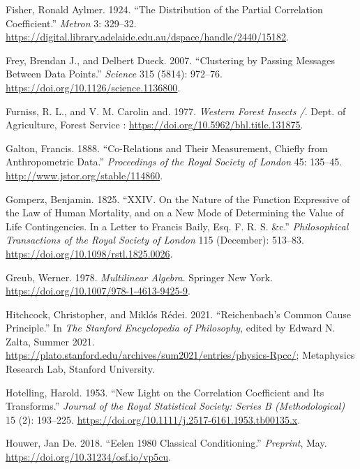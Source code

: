\documentclass[
  letterpaper,
  DIV=11,
  numbers=noendperiod]{scrreprt}
\newlength{\cslhangindent}
\newenvironment{CSLReferences}[2] %
 {\begin{list}{}{%
  \setlength{\itemindent}{0pt}
  \setlength{\leftmargin}{0pt}
  \setlength{\parsep}{0pt}
  \ifodd #1
   \setlength{\leftmargin}{\cslhangindent}
   \setlength{\itemindent}{-1\cslhangindent}
  \fi
  \setlength{\itemsep}{#2\baselineskip}}}
 {\end{list}}
\begin{document}
\begin{CSLReferences}{1}{0}
Fisher, Ronald Aylmer. 1924. {``The Distribution of the Partial
Correlation Coefficient.''} \emph{Metron} 3: 329--32.
\url{https://digital.library.adelaide.edu.au/dspace/handle/2440/15182}.

Frey, Brendan J., and Delbert Dueck. 2007. {``Clustering by Passing
Messages Between Data Points.''} \emph{Science} 315 (5814): 972--76.
\url{https://doi.org/10.1126/science.1136800}.

Furniss, R. L., and V. M. Carolin and. 1977. \emph{Western Forest
Insects /}. Dept. of Agriculture, Forest Service :
\url{https://doi.org/10.5962/bhl.title.131875}.

Galton, Francis. 1888. {``Co-Relations and Their Measurement, Chiefly
from Anthropometric Data.''} \emph{Proceedings of the Royal Society of
London} 45: 135--45. \url{http://www.jstor.org/stable/114860}.

Gomperz, Benjamin. 1825. {``{XXIV}. On the Nature of the Function
Expressive of the Law of Human Mortality, and on a New Mode of
Determining the Value of Life Contingencies. In a Letter to Francis
Baily, Esq. F. R. S. {\&}c.''} \emph{Philosophical Transactions of the
Royal Society of London} 115 (December): 513--83.
\url{https://doi.org/10.1098/rstl.1825.0026}.

Greub, Werner. 1978. \emph{Multilinear Algebra}. Springer New York.
\url{https://doi.org/10.1007/978-1-4613-9425-9}.

Hitchcock, Christopher, and Miklós Rédei. 2021. {``{Reichenbach's Common
Cause Principle}.''} In \emph{The {Stanford} Encyclopedia of
Philosophy}, edited by Edward N. Zalta, {S}ummer 2021.
\url{https://plato.stanford.edu/archives/sum2021/entries/physics-Rpcc/};
Metaphysics Research Lab, Stanford University.

Hotelling, Harold. 1953. {``New Light on the Correlation Coefficient and
Its Transforms.''} \emph{Journal of the Royal Statistical Society:
Series B (Methodological)} 15 (2): 193--225.
\url{https://doi.org/10.1111/j.2517-6161.1953.tb00135.x}.

Houwer, Jan De. 2018. {``Eelen 1980 Classical Conditioning.''}
\emph{Preprint}, May. \url{https://doi.org/10.31234/osf.io/vp5cu}.


\end{CSLReferences}
\end{document}
